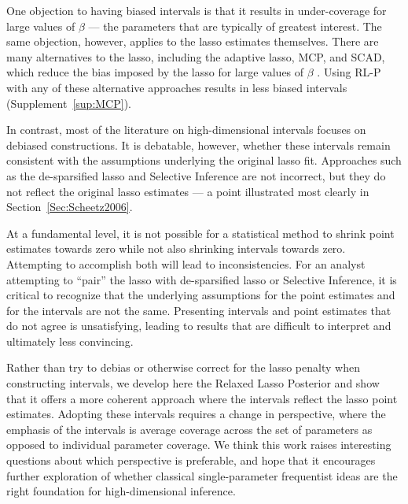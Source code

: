 One objection to having biased intervals is that it results in under-coverage for large values of $\beta$ --- the parameters that are typically of greatest interest. The same objection, however, applies to the lasso estimates themselves. There are many alternatives to the lasso, including the adaptive lasso, MCP, and SCAD, which reduce the bias imposed by the lasso for large values of $\beta$ \citep{Zou2006, Zhang2010, Fan2001}. Using RL-P with any of these alternative approaches results in less biased intervals (Supplement~\ref{sup:MCP}).

In contrast, most of the literature on high-dimensional intervals focuses on debiased constructions. It is debatable, however, whether these intervals remain consistent with the assumptions underlying the original lasso fit. Approaches such as the de-sparsified lasso and Selective Inference are not incorrect, but they do not reflect the original lasso estimates --- a point illustrated most clearly in Section~\ref{Sec:Scheetz2006}.

At a fundamental level, it is not possible for a statistical method to shrink point estimates towards zero while not also shrinking intervals towards zero. Attempting to accomplish both will lead to inconsistencies. For an analyst attempting to ``pair'' the lasso with de-sparsified lasso or Selective Inference, it is critical to recognize that the underlying assumptions for the point estimates and for the intervals are not the same. Presenting intervals and point estimates that do not agree is unsatisfying, leading to results that are difficult to interpret and ultimately less convincing.

Rather than try to debias or otherwise correct for the lasso penalty when constructing intervals, we develop here the Relaxed Lasso Posterior and show that it offers a more coherent approach where the intervals reflect the lasso point estimates. Adopting these intervals requires a change in perspective, where the emphasis of the intervals is average coverage across the set of parameters as opposed to individual parameter coverage. We think this work raises interesting questions about which perspective is preferable, and hope that it encourages further exploration of whether classical single-parameter frequentist ideas are the right foundation for high-dimensional inference.

